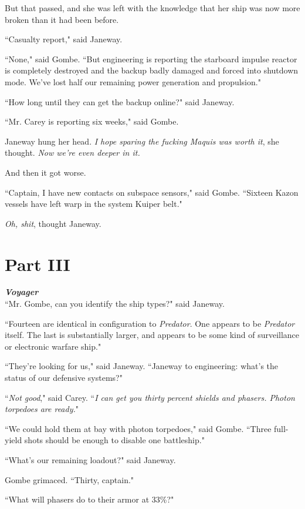 \documentclass[twoside,letterpaper,12pt]{memoir}
\begin{document}
But that passed, and she was left with the knowledge that her ship was now more broken than it had been before.

``Casualty report," said Janeway.

``None," said Gombe. ``But engineering is reporting the starboard impulse reactor is completely destroyed and the backup badly damaged and forced into shutdown mode. We've lost half our remaining power generation and propulsion."

``How long until they can get the backup online?" said Janeway.

``Mr. Carey is reporting six weeks," said Gombe.

Janeway hung her head. \textit{I hope sparing the fucking Maquis was worth it}, she thought. \textit{Now we're even deeper in it.}

And then it got worse.

``Captain, I have new contacts on subspace sensors," said Gombe. ``Sixteen Kazon vessels have left warp in the system Kuiper belt."

\textit{Oh, shit}, thought Janeway.

\chapter*{Part III}

\textit{\textbf{Voyager}}\\

``Mr. Gombe, can you identify the ship types?" said Janeway.

``Fourteen are identical in configuration to \textit{Predator}. One appears to be \textit{Predator} itself. The last is substantially larger, and appears to be some kind of surveillance or electronic warfare ship."

``They're looking for us," said Janeway. ``Janeway to engineering: what's the status of our defensive systems?"

``\textit{Not good}," said Carey. ``\textit{I can get you thirty percent shields and phasers. Photon torpedoes are ready.}"

``We could hold them at bay with photon torpedoes," said Gombe. ``Three full-yield shots should be enough to disable one battleship."

``What's our remaining loadout?" said Janeway.

Gombe grimaced. ``Thirty, captain."

``What will phasers do to their armor at 33\%?"
\end{document}
